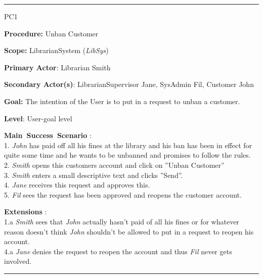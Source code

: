 \vspace{0.5cm}
\hrule
\begin{lyxlist}{PC1}
\small{
\item [\textbf{Procedure:}] Unban Customer
\item [\textbf{Scope:}] LibrarianSystem (\emph{LibSys})
\item [\textbf{Primary Actor}:] Librarian Smith
\item [\textbf{Secondary Actor(s)}:] LibrarianSupervisor Jane, SysAdmin Fil,
Customer John
\item [\textbf{Goal:}] The intention of the User is to put in a request to unban
a customer.
\item [\textbf{Level}:] User-goal level
\item [\textbf{Main~Success~Scenario}]:\\
1. \emph{John} has paid off all his fines at the library and his ban has been
in effect for quite some time and he wants to be unbanned and promises to
follow the rules.\\
2. \emph{Smith} opens this customers account and click on ''Unban Customer''\\
3. \emph{Smith} enters a small descriptive text and clicks ''Send''.\\
4. \emph{Jane} receives this request and approves this.\\
5. \emph{Fil} sees the request has been approved and reopens the customer
account.\\

\item [\textbf{Extensions}]:\\
1.a \emph{Smith} sees that \emph{John} actually hasn't paid of all his fines or
for whatever reason doesn't think \emph{John} shouldn't be allowed to put in a
request to reopen his account.\\
4.a \emph{Jane} denies the request to reopen the account and thus \emph{Fil}
never gets involved.\\
}

\end{lyxlist}
\hrule


